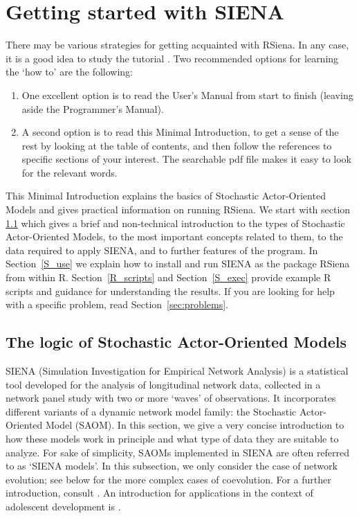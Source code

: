 \documentclass[a4paper,fleqn,11pt]{article}
\newcommand{\+}{\, + \,}
\newcommand{\R}{{\sf R }}
\newcommand{\Rn}{{\sf R}}
\newcommand{\rs}{{\sf RSiena}}
\newcommand{\RS}{{\sf \textsf{RSiena} }}
\newcommand{\SI}{{\sf SIENA }}
\newcommand{\si}{{\sf SIENA}}
\newcommand{\SAOM}{{Stochastic Actor-Oriented Model }}
\newcommand{\saom}{{Stochastic Actor-Oriented Model}}
\begin{document}
\newpage

\section{Getting started with \SI}
\label{S_minsi1}

There may be various strategies for getting acquainted with \rs.
In any case, it is a good idea to study the tutorial  \citet{SnijdersEA10b}.
Two recommended options for learning the `how to' are the following:
\begin{enumerate}
\item One excellent option is to read the User's Manual
from start to finish (leaving aside the Programmer's Manual).
\item A second option is to read this Minimal Introduction, to get a sense
 of the rest by looking at the table of contents, and then follow
			the references to specific sections of your interest.
  The searchable pdf file makes it easy to look for the relevant words.
\end{enumerate}

\noindent
This Minimal Introduction explains the basics of {\saom}s
and gives practical information on running \rs.
We start with section \ref{S_logic} which gives a brief and non-technical
introduction to the types of {\saom}s, to the most important concepts related
to them, to the data required to apply \si, and to further features of the program.
In Section~\ref{S_use} we explain how to install and run \SI
as the package \RS from within \Rn. Section~\ref{R_scripts} and
Section~\ref{S_exec} provide example \R scripts and guidance for
understanding the results.
If you are looking for help with a specific problem, read
Section~\ref{sec:problems}.


\subsection{The logic of {\saom}s}
\label{S_logic}

\SI (Simulation Investigation for Empirical Network Analysis) is a
statistical tool developed for the analysis of longitudinal network data,
collected in a network panel study with two or more `waves' of observations.
It incorporates different variants of a dynamic network model family:
the \SAOM (SAOM). In this section, we give
a very concise introduction to how these models work in principle and what
type of data they are suitable to analyze. For sake of simplicity,
SAOMs implemented in \SI are often referred to as `\SI models'.
In this subsection, we only consider the case of network evolution;
see below for the more complex cases of coevolution.
For a further introduction, consult  \citet{SnijdersEA10b}.
An introduction for applications in the context of adolescent
development is \citet{VeenstraEtAl2013}.
\end{document}

